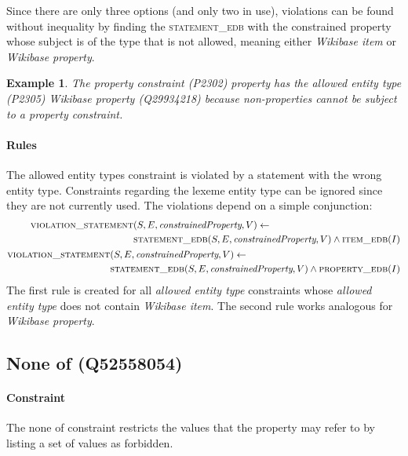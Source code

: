 \documentclass[hyperref,bachelorofscience,fleqn]{cgvpub}
\newtheorem{example}{Example}
\begin{document}
Since there are only three options (and only two in use), violations can be found without inequality by finding the \textsc{statement\_edb} with the constrained property whose subject is of the type that is not allowed, meaning either \emph{Wikibase item} or \emph{Wikibase property}.

\begin{example}
The \emph{property constraint} (P2302) property has the \emph{allowed entity type} (P2305) \emph{Wikibase property} (Q29934218) because non-properties cannot be subject to a property constraint.
\end{example}

\paragraph{Rules}
The allowed entity types constraint is violated by a statement with the wrong entity type.  Constraints regarding the lexeme entity type can be ignored since they are not currently used. The violations depend on a simple conjunction:
\begin{align}
\begin{split}
\textsc{violation\_statement}&(S, E, \emph{constrainedProperty}, V) \leftarrow \\
&\textsc{statement\_edb}(S, E, \emph{constrainedProperty}, V) \wedge \textsc{item\_edb}(I)
\end{split}\\
\begin{split}
\textsc{violation\_statement}&(S, E, \emph{constrainedProperty}, V) \leftarrow \\
&\textsc{statement\_edb}(S, E, \emph{constrainedProperty}, V) \wedge \textsc{property\_edb}(I)
\end{split}
\end{align}
The first rule is created for all \emph{allowed entity type} constraints whose \emph{allowed entity type} does not contain \emph{Wikibase item}. The second rule works analogous for \emph{Wikibase property}.

\subsection{None of (Q52558054)}
\paragraph{Constraint}
The none of constraint restricts the values that the property may refer to by listing a set of values as forbidden.
\end{document}
